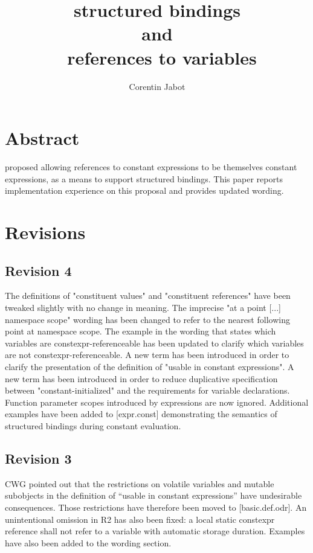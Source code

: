 \documentclass{wg21}
\title{\tcode{constexpr} structured bindings\\{\small and}\\\ references to \tcode{constexpr} variables}
\author{Corentin Jabot}{corentin.jabot@gmail.com}
\begin{document}
\maketitle

\section{Abstract}

 proposed allowing references to constant expressions to be themselves constant expressions,
as a means to support  structured bindings.
This paper reports implementation experience on this proposal and provides updated wording.


\section{Revisions}

\subsection{Revision 4}

The definitions of "constituent values" and "constituent references" have been
tweaked slightly with no change in meaning.  The imprecise "at a point [...]
namespace scope" wording has been changed to refer to the nearest following
point at namespace scope.  The example in the wording that states which
variables are constexpr-referenceable has been updated to clarify which
variables are not constexpr-referenceable.  A new term has been introduced in
order to clarify the presentation of the definition of "usable in constant
expressions".  A new term has been introduced in order to reduce duplicative
specification between "constant-initialized" and the requirements for
 variable declarations.  Function parameter scopes introduced
by  expressions are now ignored.  Additional examples have been
added to [expr.const] demonstrating the semantics of structured bindings during
constant evaluation.

\subsection{Revision 3}

CWG pointed out that the restrictions on volatile variables and mutable subobjects in the definition of ``usable in constant expressions'' have undesirable consequences. Those restrictions have therefore been moved to [basic.def.odr]. An unintentional omission in R2 has also been fixed: a local static constexpr reference shall not refer to a variable with automatic storage duration. Examples have also been added to the wording section.
\end{document}
